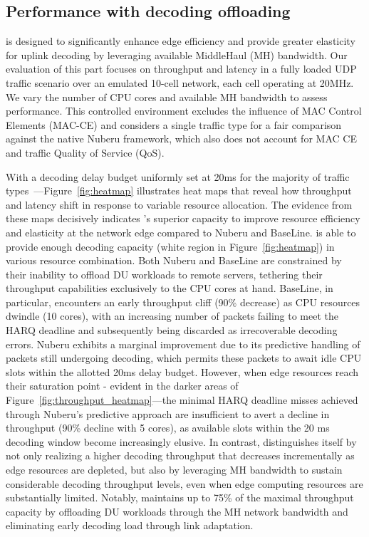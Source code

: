 \subsection{Performance with decoding offloading}
\Name{} is designed to significantly enhance edge efficiency and provide greater elasticity for uplink decoding by leveraging available MiddleHaul (MH) bandwidth. Our evaluation of this part focuses on throughput and latency in a fully loaded UDP traffic scenario over an emulated 10-cell network, each cell operating at 20MHz. We vary the number of CPU cores and available MH bandwidth to assess performance. This controlled environment excludes the influence of MAC Control Elements (MAC-CE) and considers a single traffic type for a fair comparison against the native Nuberu framework, which also does not account for MAC CE and traffic Quality of Service (QoS).

With a decoding delay budget uniformly set at 20ms for the majority of traffic types~\cite{3gpp}—Figure~\ref{fig:heatmap} illustrates heat maps that reveal how throughput and latency shift in response to variable resource allocation. The evidence from these maps decisively indicates \Name{}'s superior capacity to improve resource efficiency and elasticity at the network edge compared to Nuberu and BaseLine. \Name{} is able to provide enough decoding capacity (white region in Figure~\ref{fig:heatmap}) in various resource combination. Both Nuberu and BaseLine are constrained by their inability to offload DU workloads to remote servers, tethering their throughput capabilities exclusively to the CPU cores at hand. BaseLine, in particular, encounters an early throughput cliff (90\% decrease) as CPU resources dwindle (10 cores), with an increasing number of packets failing to meet the HARQ deadline and subsequently being discarded as irrecoverable decoding errors. Nuberu exhibits a marginal improvement due to its predictive handling of packets still undergoing decoding, which permits these packets to await idle CPU slots within the allotted 20ms delay budget. However, when edge resources reach their saturation point - evident in the darker areas of Figure~\ref{fig:throughput_heatmap}—the minimal HARQ deadline misses achieved through Nuberu's predictive approach are insufficient to avert a decline in throughput (90\% decline with 5 cores), as available slots within the 20 ms decoding window become increasingly elusive.
In contrast, \Name{} distinguishes itself by not only realizing a higher decoding throughput that decreases incrementally as edge resources are depleted, but also by leveraging MH bandwidth to sustain considerable decoding throughput levels, even when edge computing resources are substantially limited. Notably, \Name{} maintains up to 75\% of the maximal throughput capacity by offloading DU workloads through the MH network bandwidth and eliminating early decoding load through link adaptation.

